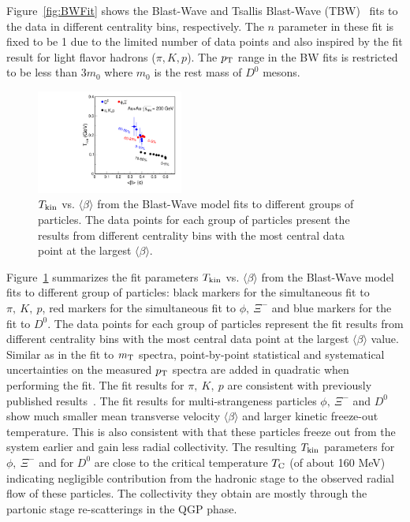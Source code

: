 \documentclass[%
 reprint,	
 amsmath,amssymb,
 aps,
 prc,
]{revtex4-1}
\begin{document}
Figure~\ref{fig:BWFit} shows the Blast-Wave and Tsallis Blast-Wave (TBW)~\cite{Tang:2008ud} fits to the data in different centrality bins, respectively. The $n$ parameter in these fit is fixed to be 1 due to the limited number of data points and also inspired by the fit result for light flavor hadrons ($\pi,K,p$). The $p_{\rm T}$ range in the BW fits is restricted to be less than 3$m_{0}$ where $m_{0}$ is the rest mass of $D^0$ mesons.

\begin{figure}
\centering
\includegraphics[width=0.43\textwidth]{fig/TvsBeta.pdf}
\caption{$T_{\rm kin}$ vs. $\langle\beta\rangle$ from the Blast-Wave model fits to different groups of particles. The data points for each group of particles present the results from different centrality bins with the most central data point at the largest $\langle\beta\rangle$.}
\label{fig:BWFitSummary} 
\end{figure}

Figure~\ref{fig:BWFitSummary} summarizes the fit parameters $T_{\rm kin}$ vs. $\langle\beta\rangle$ from the Blast-Wave model fits to different group of particles: black markers for the simultaneous fit to $\pi,\ K,\ p$, red markers for the simultaneous fit to $\phi,\ \Xi^-$ and blue markers for the fit to $D^0$. The data points for each group of particles represent the fit results from different centrality bins with the most central data point at the largest $\langle\beta\rangle$ value. Similar as in the fit to $m_{\rm T}$ spectra, point-by-point statistical and systematical uncertainties on the measured $p_{\rm T}$ spectra are added in quadratic when performing the fit. The fit results for $\pi,\ K,\ p$ are consistent with previously published results~\cite{Tang:2008ud}. The fit results for multi-strangeness particles $\phi,\ \Xi^{-}$ and $D^0$ show much smaller mean transverse velocity $\langle\beta\rangle$ and larger kinetic freeze-out temperature. This is also consistent with that these particles freeze out from the system earlier and gain less radial collectivity. The resulting $T_{\rm kin}$ parameters for $\phi,\ \Xi^-$ and for $D^0$ are close to the critical temperature $T_{\rm C}$ (of about 160 MeV) indicating negligible contribution from the hadronic stage to the observed radial flow of these particles. The collectivity they obtain are mostly through the partonic stage re-scatterings in the QGP phase. 
\end{document}
